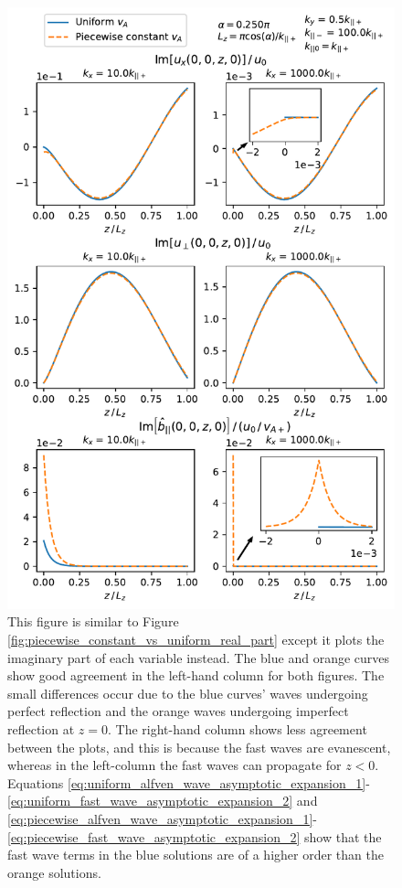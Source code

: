 \begin{figure}
    \centering
    \vspace{-20pt}
    \includegraphics[width=\textwidth,height=0.9\textheight,keepaspectratio]{figures/chapter04/piecewise_constant_vs_uniform_imag_part.pdf}
    \vspace{-10pt}
    \caption{This figure is similar to Figure \ref{fig:piecewise_constant_vs_uniform_real_part} except it plots the imaginary part of each variable instead. The blue and orange curves show good agreement in the left-hand column for both figures. The small differences occur due to the blue curves' waves undergoing perfect reflection and the orange waves undergoing imperfect reflection at $z=0$. The right-hand column shows less agreement between the plots, and this is because the fast waves are evanescent, whereas in the left-column the fast waves can propagate for $z<0$. Equations  \eqref{eq:uniform_alfven_wave_asymptotic_expansion_1}-\eqref{eq:uniform_fast_wave_asymptotic_expansion_2} and \eqref{eq:piecewise_alfven_wave_asymptotic_expansion_1}-\eqref{eq:piecewise_fast_wave_asymptotic_expansion_2} show that the fast wave terms in the blue solutions are of a higher order than the orange solutions.}
    \label{fig:piecewise_constant_vs_uniform_imag_part}
    \vspace{-20pt}
\end{figure}

